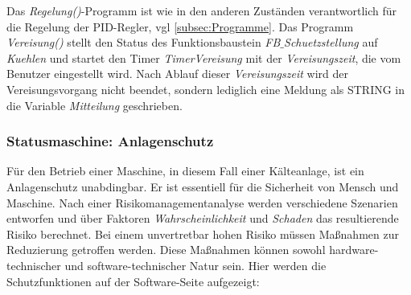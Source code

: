 Das \textit{Regelung()}-Programm ist wie in den anderen Zuständen verantwortlich für die Regelung der PID-Regler, vgl \ref{subsec:Programme}. 
Das Programm \textit{Vereisung()} stellt den Status des Funktionsbaustein \textit{FB$\_$Schuetzstellung} auf \textit{Kuehlen} und startet den Timer  \textit{TimerVereisung} mit der \textit{Vereisungszeit}, die vom Benutzer eingestellt wird. Nach Ablauf dieser \textit{Vereisungszeit} wird der Vereisungsvorgang nicht beendet, sondern lediglich eine Meldung als STRING in die Variable \textit{Mitteilung} geschrieben. 

\subsubsection*{Statusmaschine: Anlagenschutz}
Für den Betrieb einer Maschine, in diesem Fall einer Kälteanlage, ist ein Anlagenschutz unabdingbar. Er ist essentiell für die Sicherheit von Mensch und Maschine. Nach einer Risikomanagementanalyse werden verschiedene Szenarien entworfen und über Faktoren \textit{Wahrscheinlichkeit} und \textit{Schaden} das resultierende Risiko berechnet. 
Bei einem unvertretbar hohen Risiko müssen Maßnahmen zur Reduzierung getroffen werden. Diese Maßnahmen können sowohl hardware-technischer und software-technischer Natur sein. Hier werden die Schutzfunktionen auf der Software-Seite aufgezeigt:

